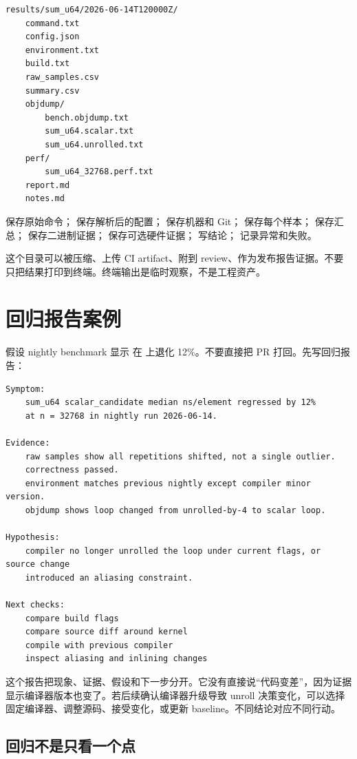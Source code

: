 \begin{lstlisting}
results/sum_u64/2026-06-14T120000Z/
    command.txt
    config.json
    environment.txt
    build.txt
    raw_samples.csv
    summary.csv
    objdump/
        bench.objdump.txt
        sum_u64.scalar.txt
        sum_u64.unrolled.txt
    perf/
        sum_u64_32768.perf.txt
    report.md
    notes.md
\end{lstlisting}

 保存原始命令； 保存解析后的配置； 保存机器和 Git； 保存每个样本； 保存汇总； 保存二进制证据； 保存可选硬件证据； 写结论； 记录异常和失败。

这个目录可以被压缩、上传 CI artifact、附到 review、作为发布报告证据。不要只把结果打印到终端。终端输出是临时观察，不是工程资产。

\section{回归报告案例}

假设 nightly benchmark 显示  在  上退化 12\%。不要直接把 PR 打回。先写回归报告：

\begin{lstlisting}
Symptom:
    sum_u64 scalar_candidate median ns/element regressed by 12%
    at n = 32768 in nightly run 2026-06-14.

Evidence:
    raw samples show all repetitions shifted, not a single outlier.
    correctness passed.
    environment matches previous nightly except compiler minor version.
    objdump shows loop changed from unrolled-by-4 to scalar loop.

Hypothesis:
    compiler no longer unrolled the loop under current flags, or source change
    introduced an aliasing constraint.

Next checks:
    compare build flags
    compare source diff around kernel
    compile with previous compiler
    inspect aliasing and inlining changes
\end{lstlisting}

这个报告把现象、证据、假设和下一步分开。它没有直接说“代码变差”，因为证据显示编译器版本也变了。若后续确认编译器升级导致 unroll 决策变化，可以选择固定编译器、调整源码、接受变化，或更新 baseline。不同结论对应不同行动。

\subsection{回归不是只看一个点}

